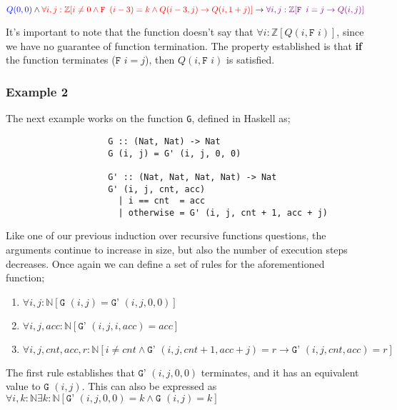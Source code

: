 \documentclass[a4paper, 12pt]{article}
\begin{document}
                $\textcolor{blue}{Q(0, 0)} \land \textcolor{red}{\forall i, j : \mathbb{Z} [i \neq 0 \land \texttt{F } (i - 3) = k \land Q(i - 3, j) \rightarrow Q(i, 1 + j)]} \rightarrow \textcolor{violet}{\forall i, j : \mathbb{Z} [\texttt{F } i = j \rightarrow Q(i, j)]}$
                \medskip

                It's important to note that the function doesn't say that $\forall i : \mathbb{Z} [Q(i, \texttt{F } i)]$, since we have no guarantee of function termination. The property established is that \textbf{if} the function terminates ($\texttt{F } i = j$), then $Q(i, \texttt{F } i)$ is satisfied.
            \subsubsection*{Example 2}
                The next example works on the function \texttt{G}, defined in Haskell as;
                \begin{lstlisting}
                    G :: (Nat, Nat) -> Nat
                    G (i, j) = G' (i, j, 0, 0)

                    G' :: (Nat, Nat, Nat, Nat) -> Nat
                    G' (i, j, cnt, acc)
                      | i == cnt  = acc
                      | otherwise = G' (i, j, cnt + 1, acc + j)
                \end{lstlisting}
                Like one of our previous induction over recursive functions questions, the arguments continue to increase in size, but also the number of execution steps decreases. Once again we can define a set of rules for the aforementioned function;
                \begin{enumerate}[R1]
                    \itemsep0em
                    \item $\forall i, j : \mathbb{N} [\texttt{G } (i, j) = \texttt{G' } (i, j, 0, 0)]$
                    \item $\forall i, j, acc : \mathbb{N} [\texttt{G' } (i, j, i, acc) = acc]$
                    \item $\forall i, j, cnt, acc, r : \mathbb{N} [i \neq cnt \land \texttt{G' } (i, j, cnt + 1, acc + j) = r \rightarrow \texttt{G' } (i, j, cnt, acc) = r]$
                \end{enumerate}
                The first rule establishes that $\texttt{G' } (i, j, 0, 0)$ terminates, and it has an equivalent value to $\texttt{G } (i, j)$. This can also be expressed as $\forall i, k : \mathbb{N} \exists k : \mathbb{N} [\texttt{G' } (i, j, 0, 0) = k \land \texttt{G } (i, j) = k]$
                \medskip
\end{document}
